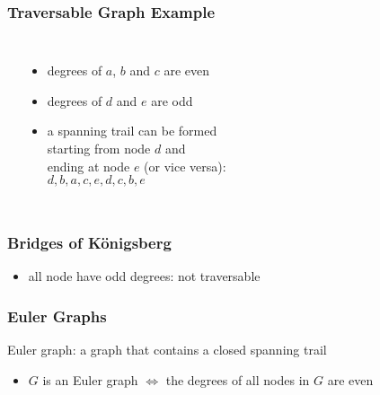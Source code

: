 \documentclass[dvipsnames]{beamer}
\begin{document}
\begin{frame}
  \frametitle{Traversable Graph Example}

  \begin{example}
    \begin{columns}
      \begin{center}
      \end{center}

      \begin{itemize}
        \item degrees of $a$, $b$ and $c$ are even
        \item degrees of $d$ and $e$ are odd

        \pause
        \medskip
        \item a spanning trail can be formed\\
          starting from node $d$ and\\
          ending at node $e$ (or vice versa):\\
          $d,b,a,c,e,d,c,b,e$
      \end{itemize}
    \end{columns}
  \end{example}
\end{frame}

\begin{frame}
  \frametitle{Bridges of Königsberg}

  \begin{center}
  \end{center}

  \begin{itemize}
    \item all node have odd degrees: not traversable
  \end{itemize}
\end{frame}

\begin{frame}
  \frametitle{Euler Graphs}

  \begin{definition}
    \alert{Euler graph}: a graph that contains a closed spanning trail
  \end{definition}

  \begin{itemize}
    \item $G$ is an Euler graph $\Leftrightarrow$
      the degrees of all nodes in $G$ are even
  \end{itemize}
\end{frame}
\end{document}

